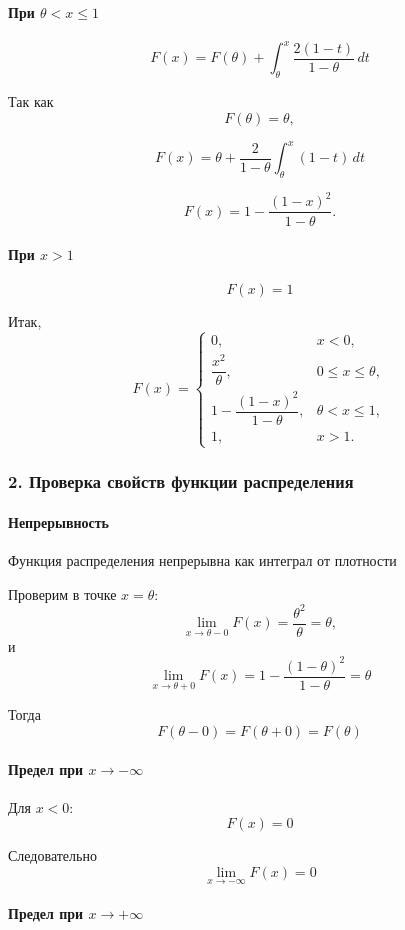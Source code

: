 \documentclass[12pt,a4paper]{article}
\theoremstyle{definition}
\begin{document}
\paragraph{При $\theta<x\le1$}
\[F(x)=F(\theta)+\int_\theta^x\frac{2(1-t)}{1-\theta}\,dt\]

Так как
\[F(\theta)=\theta,\]

\[F(x)=\theta+\frac{2}{1-\theta}\int_\theta^x(1-t)\,dt\]

\[F(x)=1-\frac{(1-x)^2}{1-\theta}.\]

\paragraph{При $x>1$}
\[F(x)=1\]

Итак,
\[F(x)=
\begin{cases}
0, & x<0,\\[1ex]
\dfrac{x^2}{\theta}, & 0\le x\le\theta,\\[2ex]
1-\dfrac{(1-x)^2}{1-\theta},
& \theta<x\le1,\\[2ex]
1, & x>1.
\end{cases}\]

\subsubsection*{2. Проверка свойств функции распределения}

\paragraph{Непрерывность}

Функция распределения непрерывна как интеграл от плотности

Проверим в точке $x=\theta$:
\[\lim_{x\to\theta-0}F(x)=\frac{\theta^2}{\theta}=\theta,\]
и
\[\lim_{x\to\theta+0}F(x)=1-\frac{(1-\theta)^2}{1-\theta}=\theta\]

Тогда
\[F(\theta-0)=F(\theta+0)=F(\theta)\]

\paragraph{Предел при $x\to-\infty$}

Для $x<0$:
\[F(x)=0\]

Следовательно
\[\lim_{x\to-\infty}F(x)=0\]

\paragraph{Предел при $x\to+\infty$}
\end{document}
